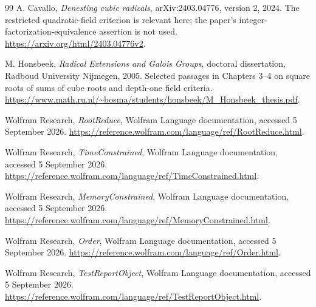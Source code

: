 \documentclass[11pt,letterpaper]{article}
\theoremstyle{definition}
\begin{document}
\begin{thebibliography}{99}
 A. Cavallo, \emph{Denesting cubic radicals}, arXiv:2403.04776, version 2, 2024. The restricted quadratic-field criterion is relevant here; the paper's integer-factorization-equivalence assertion is not used.\newline
\url{https://arxiv.org/html/2403.04776v2}.

 M. Honsbeek, \emph{Radical Extensions and Galois Groups}, doctoral dissertation, Radboud University Nijmegen, 2005. Selected passages in Chapters 3--4 on square roots of sums of cube roots and depth-one field criteria.\newline
\url{https://www.math.ru.nl/~bosma/students/honsbeek/M_Honsbeek_thesis.pdf}.

 Wolfram Research, \emph{RootReduce}, Wolfram Language documentation, accessed 5 September 2026.\newline
\url{https://reference.wolfram.com/language/ref/RootReduce.html}.

 Wolfram Research, \emph{TimeConstrained}, Wolfram Language documentation, accessed 5 September 2026.\newline
\url{https://reference.wolfram.com/language/ref/TimeConstrained.html}.

 Wolfram Research, \emph{MemoryConstrained}, Wolfram Language documentation, accessed 5 September 2026.\newline
\url{https://reference.wolfram.com/language/ref/MemoryConstrained.html}.

 Wolfram Research, \emph{Order}, Wolfram Language documentation, accessed 5 September 2026.\newline
\url{https://reference.wolfram.com/language/ref/Order.html}.

 Wolfram Research, \emph{TestReportObject}, Wolfram Language documentation, accessed 5 September 2026.\newline
\url{https://reference.wolfram.com/language/ref/TestReportObject.html}.
\end{thebibliography}
\end{document}
